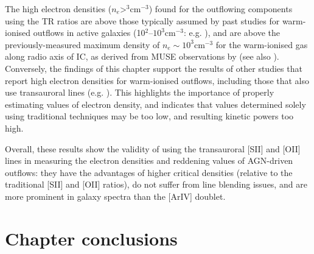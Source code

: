 The high electron densities (\mbox{$n_e$\;\textgreater{}$^3$\;cm$^{-3}$}) found for the outflowing components using the TR ratios are above those typically assumed by past studies for warm-ionised outflows in active galaxies (\mbox{10$^{2}$--$10^3$\;cm$^{-3}$}: e.g. \citealt{Liu2013, Harrison2014, Fiore2017}), and are above the previously-measured maximum density of $n_e\sim10^3$\;cm$^{-3}$ for the warm-ionised gas along radio axis of IC, as derived from MUSE observations by \citet{Mingozzi2019} (see also \citealt{Venturi2021}). Conversely, the findings of this chapter support the results of other studies that report high electron densities for warm-ionised outflows, including those that also use transauroral lines (e.g. \citealt{Holt2011, Rose2018, Santoro2018, Spence2018, Baron2019b, Davies2020}). This highlights the importance of properly estimating values of electron density, and indicates that values determined solely using traditional techniques may be too low, and resulting kinetic powers too high.

Overall, these results show the validity of using the transauroral [SII] and [OII] lines in measuring the electron densities and reddening values of AGN-driven outflows: they have the advantages of higher critical densities (relative to the traditional [SII] and [OII] ratios), do not suffer from line blending issues, and are more prominent in galaxy spectra than the [ArIV] doublet.

\section{Chapter conclusions}
\label{section: xshooter_ic5063: conclusions}

